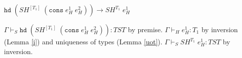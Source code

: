 \begin{case}
$\mathtt{hd}\;(SH^{[T_{1}]}\;(\mathtt{cons}\;e_{H}^{1}\;e_{H}^{2}))\rightarrow SH^{T_{1}}\;e_{H}^{1}$

$\Gamma\vdash_{S}\mathtt{hd}\;(SH^{[T_{1}]}\;(\mathtt{cons}\;e_{H}^{1}\;e_{H}^{2})):TST$ by premise.  $\Gamma\vdash_{H}e_{H}^{1}:T_{1}$ by inversion (Lemma \ref{i}) and uniqueness of types (Lemma \ref{uot}).  $\Gamma\vdash_{S}SH^{T_{1}}\;e_{H}^{1}:TST$ by inversion.
\end{case}